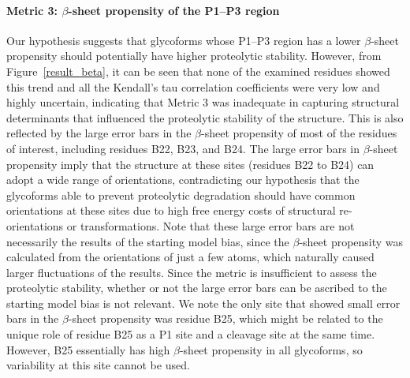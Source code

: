 \documentclass[9pt]{elife}
\begin{document}
\paragraph{Metric 3: $\beta$-sheet propensity of the P1--P3 region}
Our hypothesis suggests that glycoforms whose P1--P3 region has a lower $\beta$-sheet propensity should potentially have higher proteolytic stability. However, from Figure~\ref{result_beta}, it can be seen that none of the examined residues showed this trend and all the Kendall's tau correlation coefficients were very low and highly uncertain, indicating that Metric 3 was inadequate in capturing structural determinants that influenced the proteolytic stability of the structure. This is also reflected by the large error bars in the $\beta$-sheet propensity of most of the residues of interest, including residues B22, B23, and B24. The large error bars in $\beta$-sheet propensity imply that the structure at these sites (residues B22 to B24) can adopt a wide range of orientations, contradicting our hypothesis that the glycoforms able to prevent proteolytic degradation should have common orientations at these sites due to high free energy costs of structural re-orientations or transformations. Note that these large error bars are not necessarily the results of the starting model bias, since the $\beta$-sheet propensity was calculated from the orientations of just a few atoms, which naturally caused larger fluctuations of the results. Since the metric is insufficient to assess the proteolytic stability, whether or not the large error bars can be ascribed to the starting model bias is not relevant. We note the only site that showed small error bars in the $\beta$-sheet propensity was residue B25, which might be related to the unique role of residue B25 as a P1 site and a cleavage site at the same time. However, B25 essentially has high $\beta$-sheet propensity in all glycoforms, so variability at this site cannot be used.
\end{document}
